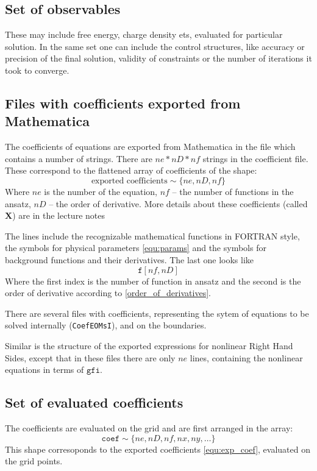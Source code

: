 \documentclass[a4paper,12pt]{article}
\begin{document}
\subsection{\label{sec:observable_set} Set of observables}
These may include free energy, charge density ets, evaluated for particular solution. In the same set one can include the control structures, like accuracy or precision of the final solution, validity of constraints or the number of iterations it took to converge.

\subsection{\label{sec:coef_files} Files with coefficients exported from Mathematica}
The coefficients of equations are exported from Mathematica in the file which contains a number of strings. There are $ne*nD*nf$ strings in the coefficient file. These correspond to the flattened array of coefficients of the shape:
\begin{equation}
\label{equ:exp_coef}
\mbox{exported coefficients} \sim \{ne, nD, nf\}
\end{equation}
Where $ne$ is the number of the equation, $nf$ -- the number of functions in the ansatz, $nD$ -- the order of derivative. More details about these coefficients (called $\mathbf{X}$) are in the lecture notes \cite{Krikun:2018ufr}

The lines include the recognizable mathematical functions in FORTRAN style, the symbols for physical parameters \ref{equ:params} and the symbols for background functions and their derivatives. The last one looks like
\begin{equation}
\label{equ:gfi}
\mathtt{f}[nf,nD]
\end{equation}
Where the first index is the number of function in ansatz and the second is the order of derivative according to \eqref{order_of_derivatives}.

There are several files with coefficients, representing the sytem of equations to be solved internally (\texttt{CoefEOMsI}), and on the boundaries.

Similar is the structure of the exported expressions for nonlinear Right Hand Sides, except that in these files there are only $ne$ lines, containing the nonlinear equations in terms of $\mathtt{gfi}$.

\subsection{\label{sec:set_coef} Set of evaluated coefficients}
The coefficients are evaluated on the grid and are first arranged in the array:
\begin{equation}
\label{equ:coef}
\mathtt{coef} \sim \{ne, nD, nf, nx, ny, \dots  \}
\end{equation}
This shape corresoponds to the exported coefficients \eqref{equ:exp_coef}, evaluated on the grid points.
\end{document}
